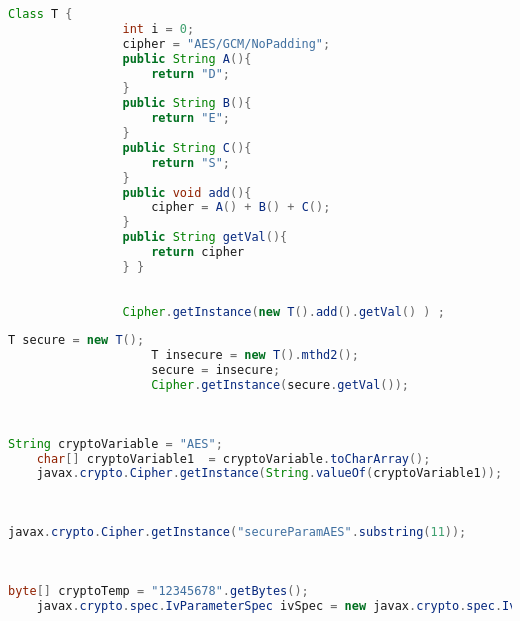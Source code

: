             \begin{lstlisting}[frame=tb,caption={\small Method Builder}, label={lst:methodbuilder},language=java]
                Class T {
                int i = 0;
                cipher = "AES/GCM/NoPadding";
                public String A(){
                    return "D";
                }
                public String B(){
                    return "E";
                }
                public String C(){
                    return "S";
                }
                public void add(){
                    cipher = A() + B() + C();
                }
                public String getVal(){
                    return cipher
                } }
        
        
                Cipher.getInstance(new T().add().getVal() ) ;
                \end{lstlisting}
                \vspace{-0.25em}
            

                \begin{lstlisting}[frame=tb,caption={\small Iterative Conditionals, using the object created in Listing A.1}, label={lst:iterativeconditionals},language=java]
                    T secure = new T();
                    T insecure = new T().mthd2();
                    secure = insecure;
                    Cipher.getInstance(secure.getVal());
                    
                        
                    \end{lstlisting}
                    \vspace{-0.25em}

\begin{lstlisting}[frame=tb,caption={\small Build Variable}, label={lst:buildvariable},language=java]
    String cryptoVariable = "AES";
    char[] cryptoVariable1  = cryptoVariable.toCharArray();
    javax.crypto.Cipher.getInstance(String.valueOf(cryptoVariable1));
                        
                            
\end{lstlisting}
\vspace{-0.25em}

\begin{lstlisting}[frame=tb,caption={\small Substring}, label={lst:substring},language=java]
    javax.crypto.Cipher.getInstance("secureParamAES".substring(11));
                        
                            
\end{lstlisting}
\vspace{-0.25em}

\begin{lstlisting}[frame=tb,caption={\small Static Keystore}, label={lst:statickeystore},language=java]
    byte[] cryptoTemp = "12345678".getBytes();
    javax.crypto.spec.IvParameterSpec ivSpec = new javax.crypto.spec.IvParameterSpec.getInstance(cryptoTemp,"AES");
                        
                            
\end{lstlisting}
\vspace{-0.25em}
        


